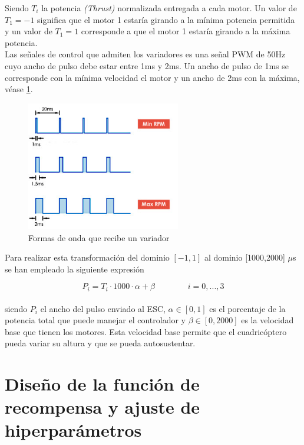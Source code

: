 Siendo $T_i$ la potencia \textit{(Thrust)} normalizada entregada a cada motor. Un valor de $T_1=-1$ significa que el motor 1 estaría girando a la mínima potencia permitida y un valor de $T_1=1$ corresponde a que el motor 1 estaría girando a la máxima potencia.\\

Las señales de control que admiten los variadores es una señal PWM de 50Hz cuyo ancho de pulso debe estar entre 1ms y 2ms. Un ancho de pulso de 1ms se corresponde con la mínima velocidad el motor y un ancho de 2ms con la máxima, véase \cref{hardware_ESCWAVE}.\newpage

\begin{figure}[htb!]
	\centering
	\includegraphics[width=0.6\textwidth]{hardware/ESCWaves}
	\caption{Formas de onda que recibe un variador}
	\label{hardware_ESCWAVE}	
\end{figure}

 Para realizar esta transformación del dominio $[-1,1]$ al dominio [1000,2000] $\mu$s se han empleado la siguiente expresión

\begin{equation}
	P_i= T_i \cdot 1000 \cdot \alpha + \beta \qquad \qquad i=0,...,3
\end{equation}\\
siendo $P_i$ el ancho del pulso enviado al ESC, $\alpha \in [0,1]$  es el porcentaje de la potencia total que puede manejar el controlador y $\beta \in [0,2000]$ es la velocidad base que tienen los motores. Esta velocidad base permite que el cuadricóptero pueda variar su altura y que se pueda autosustentar. 

\section{Diseño de la función de recompensa y ajuste de hiperparámetros}

